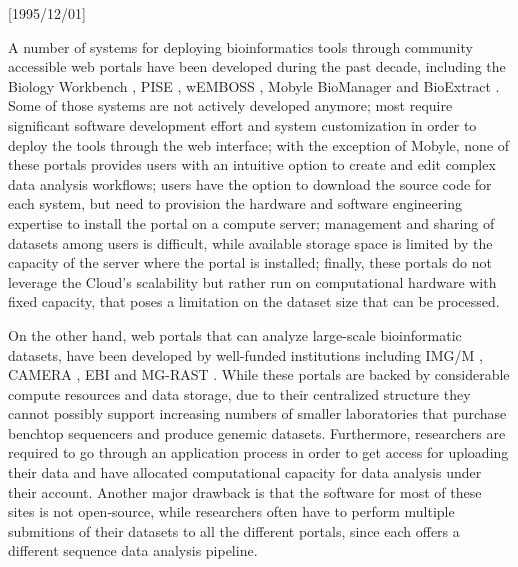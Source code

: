 \NeedsTeXFormat{LaTeX2e}[1995/12/01] \documentclass[10pt]{bmc_article}
\newenvironment{bmcformat}{\begin{raggedright}\baselineskip20pt\sloppy\setboolean{publ}{false}}{\end{raggedright}\baselineskip20pt\sloppy}
\begin{document}
\begin{bmcformat}
A number of systems for  deploying bioinformatics tools through community accessible web portals 
have been developed during the past decade, including the Biology Workbench \cite{Subramaniam1998Biology}, 
PISE \cite{Letondal2001Web}, wEMBOSS \cite{Sarachu2005WEMBOSS}, Mobyle \cite{Neron2009Mobyle}
BioManager \cite{Cattley2007BioManager} and BioExtract \cite{Lushbough2008Implementing}. Some 
of those systems are not actively developed anymore; most require significant software development effort 
and system customization in order to deploy the tools through the web interface; with the exception of Mobyle, 
none of these portals provides users with an intuitive option to create and edit complex data analysis workflows; 
users have the option to download the source code for each system, but need to provision the hardware and
software engineering expertise to install the portal on a compute server;  management and sharing of 
datasets among users is difficult, while available storage space is limited by the capacity of the server
where the portal is installed; finally, these portals do not leverage the Cloud's scalability but rather 
run on computational hardware with fixed capacity, that poses a limitation on the dataset size that can
be processed. 

On the other hand, web portals that can analyze large-scale bioinformatic datasets, have been developed by 
well-funded institutions including IMG/M \cite{Grigoriev2012}, CAMERA \cite{Altintas2010}, EBI \cite{Hunter2011} 
and MG-RAST \cite{Aziz2010}. While these portals are backed by considerable compute resources and data storage,  
due to their centralized structure they cannot possibly support increasing numbers of smaller laboratories that 
purchase benchtop sequencers and produce genemic datasets. Furthermore, researchers are required to go through 
an application process in order to get access for uploading their data and have allocated computational capacity  
for data analysis under their account. Another major drawback is that the software for most of these sites is not 
open-source, while researchers often have to perform multiple submitions of their datasets to all the different 
portals, since each offers a different sequence data analysis pipeline.   


\end{bmcformat}
\end{document}
